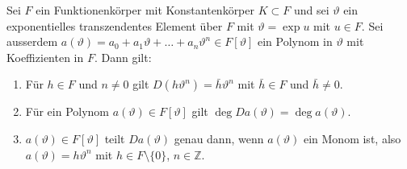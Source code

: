 \begin{satz}
\label{buch:intalg:liouville:polynome:satz:exponentiell}
Sei $F$ ein Funktionenkörper mit Konstantenkörper $K\subset F$ und sei
$\vartheta$ ein exponentielles transzendentes Element über $F$ mit
$\vartheta=\exp u$ mit $u\in F$.
Sei ausserdem
$a(\vartheta) = a_0+a_1\vartheta+\dots+a_n\vartheta^n\in F[\vartheta]$
ein Polynom in $\vartheta$ mit Koeffizienten in $F$.
Dann gilt:
\begin{enumerate}
\item
Für $h\in F$ und $n\ne 0$ gilt $D(h\vartheta^n) = \bar{h}\vartheta^n$ mit
$\bar{h}\in F$ und $\bar{h}\ne 0$.
\item
Für ein Polynom
$a(\vartheta)\in F[\vartheta]$
gilt
$\deg Da(\vartheta) = \deg a(\vartheta)$.
\item
$a(\vartheta) \in F[\vartheta]$
teilt $Da(\vartheta)$ genau dann, wenn $a(\vartheta)$ ein Monom ist,
also $a(\vartheta)=h\vartheta^n$ mit $h\in F\setminus\{0\}$, $n\in\mathbb{Z}$.
\end{enumerate}
\end{satz}

